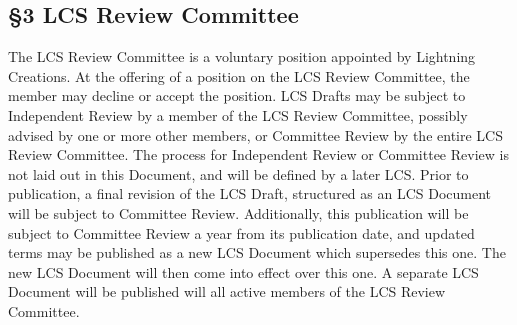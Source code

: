 \subsection{§3 LCS Review Committee}\label{lcs-review-committee}

The LCS Review Committee is a voluntary position appointed by Lightning
Creations. At the offering of a position on the LCS Review Committee,
the member may decline or accept the position. LCS Drafts may be subject
to Independent Review by a member of the LCS Review Committee, possibly
advised by one or more other members, or Committee Review by the entire
LCS Review Committee. The process for Independent Review or Committee
Review is not laid out in this Document, and will be defined by a later
LCS. Prior to publication, a final revision of the LCS Draft, structured
as an LCS Document will be subject to Committee Review. Additionally,
this publication will be subject to Committee Review a year from its
publication date, and updated terms may be published as a new LCS
Document which supersedes this one. The new LCS Document will then come
into effect over this one. A separate LCS Document will be published
will all active members of the LCS Review Committee.
